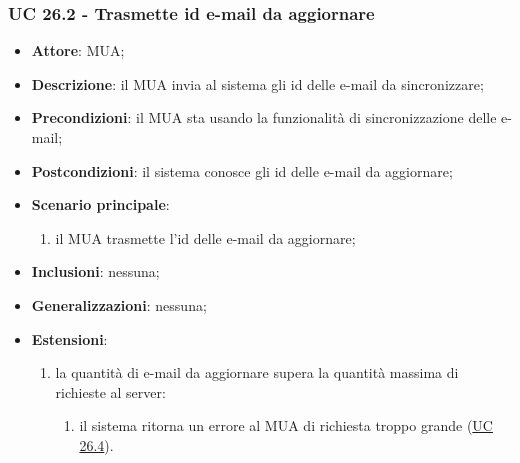     \subsubsection{UC 26.2 - Trasmette id e-mail da aggiornare} \label{sec:UC26.2}
    \begin{itemize}
        \item \textbf{Attore}: MUA;
        \item \textbf{Descrizione}: il MUA invia al sistema gli id delle e-mail da sincronizzare;
        \item \textbf{Precondizioni}: il MUA sta usando la funzionalità di sincronizzazione delle e-mail;
        \item \textbf{Postcondizioni}: il sistema conosce gli id delle e-mail da aggiornare;
        \item \textbf{Scenario principale}:
            \begin{enumerate}
                \item il MUA trasmette l'id delle e-mail da aggiornare;
            \end{enumerate}
        \item \textbf{Inclusioni}: nessuna;
        \item \textbf{Generalizzazioni}: nessuna;
        \item \textbf{Estensioni}:
            \begin{enumerate}[label=\alph*.]
                \item la quantità di e-mail da aggiornare supera la quantità massima di richieste al server:
                \begin{enumerate}[label=\arabic*.]
                    \item il sistema ritorna un errore al MUA di richiesta troppo grande (\hyperref[sec:UC26.4]{UC 26.4}).
                \end{enumerate}
            \end{enumerate}
    \end{itemize}


